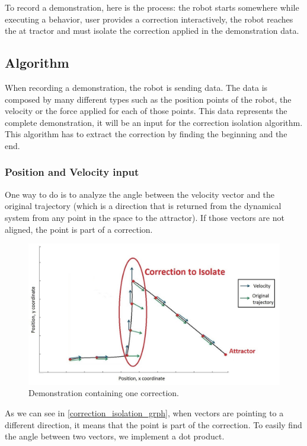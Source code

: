 To record a demonstration, here is the process: the robot starts somewhere while executing a behavior, user provides a correction interactively, the robot reaches the at tractor and must isolate the correction applied in the demonstration data.


\subsection{Algorithm}

When recording a demonstration, the robot is sending data. The data is composed by many different types such as the position points of the robot, the velocity or the force applied for each of those points. This data represents the complete demonstration, it will be an input for the correction isolation algorithm. This algorithm has to extract the correction by finding the beginning and the end.

\subsubsection{Position and Velocity input}

One way to do is to analyze the angle between the velocity vector and the original trajectory (which is a direction that is returned from the dynamical system from any point in the space to the attractor). If those vectors are not aligned, the point is part of a correction.\\

\begin{figure}[H]
\centering
\includegraphics[width=15cm]{img/correction_isolation_1.jpg}
\caption{Demonstration containing one correction.}
\label{correction_isolation_grph}
\end{figure}

As we can see in \autoref{correction_isolation_grph}, when vectors are pointing to a different direction, it means that the point is part of the correction.
To easily find the angle between two vectors, we implement a dot product.

